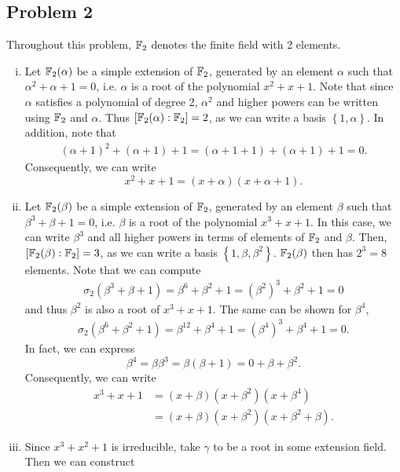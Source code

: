 \documentclass{../../mathnotes}
\begin{document}
\subsection*{Problem 2}

Throughout this problem, $\mathbb{F}_2$ denotes the finite field with 2 elements.
\begin{enumerate}[(i)]
    \item Let $\mathbb{F}_2(\alpha)$ be a simple extension of $\mathbb{F}_2$, generated by an element $\alpha$ such that $\alpha^2+\alpha+1=0$,
        i.e. $\alpha$ is a root of the polynomial $x^2+x+1$. Note that since $\alpha$ satisfies a polynomial of degree 2, $\alpha^2$
        and higher powers can be written using $\mathbb{F}_2$ and $\alpha$. Thus $[\mathbb{F}_2(\alpha):\mathbb{F}_2]=2$, as we can write a basis
        $\left\{ 1,\alpha \right\}$. In addition, note that
        \begin{align*}
            (\alpha+1)^2+(\alpha+1)+1=(\alpha+1+1)+(\alpha+1)+1=0.
        \end{align*}
        Consequently, we can write
        \[x^2+x+1=(x+\alpha)(x+\alpha+1).\]
    \item Let $\mathbb{F}_2(\beta)$ be a simple extension of $\mathbb{F}_2$, generated by an element $\beta$ such that $\beta^3+\beta+1=0$, i.e.
        $\beta$ is a root of the polynomial $x^3+x+1$. In this case, we can write $\beta^3$ and all higher powers in terms of
        elements of $\mathbb{F}_2$ and $\beta$. Then, $[\mathbb{F}_2(\beta):\mathbb{F}_2]=3$, as we can write a basis $\left\{ 1,\beta,\beta^2 \right\}$.
        $\mathbb{F}_2(\beta)$ then has $2^3=8$ elements. Note that we can compute
        \begin{align*}
            \sigma_2(\beta^3+\beta+1)=\beta^6+\beta^2+1=(\beta^2)^3+\beta^2+1=0
        \end{align*}
        and thus $\beta^2$ is also a root of $x^3+x+1$. The same can be shown for $\beta^4$,
        \begin{align*}
            \sigma_2(\beta^6+\beta^2+1)=\beta^{12}+\beta^4+1=(\beta^4)^3+\beta^4+1=0.
        \end{align*}
        In fact, we can express
        \[\beta^4=\beta\beta^3=\beta(\beta+1)=0+\beta+\beta^2.\]
        Consequently, we can write
        \begin{align*}
            x^3+x+1&=(x+\beta)(x+\beta^2)(x+\beta^4)\\
            &=(x+\beta)(x+\beta^2)(x+\beta^2+\beta).
        \end{align*}
    \item Since $x^3+x^2+1$ is irreducible, take $\gamma$ to be a root in some extension field. Then we can construct

\end{enumerate}
\end{document}
